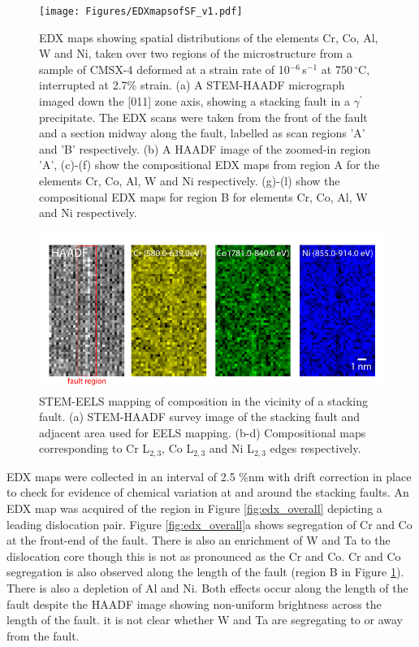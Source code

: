 \documentclass[a4paper,12pt,times,numbered,print,index]{Classes/PhDThesisPSnPDF}
\begin{document}
\begin{figure}
    \centering
    \texttt{[image: Figures/EDXmapsofSF\_v1.pdf]}
    \caption{EDX maps showing spatial distributions of the elements Cr, Co, Al, W and Ni, taken over two regions of the microstructure from a sample of CMSX-4 deformed at a strain rate of 10$^{-6}$\,s$^{-1}$ at 750\,$^\circ$C, interrupted at 2.7\% strain. (a) A STEM-HAADF micrograph imaged down the [011] zone axis, showing a stacking fault in a $\gamma^\prime$ precipitate. The EDX scans were taken from the front of the fault and a section midway along the fault, labelled as scan regions 'A' and 'B' respectively. (b) A HAADF image of the zoomed-in region 'A', (c)-(f) show the compositional EDX maps from region A for the elements Cr, Co, Al, W and Ni respectively. (g)-(l) show the compositional EDX maps for region B for elements Cr, Co, Al, W and Ni respectively.}
    \label{fig:edx_maps}
\end{figure}
\begin{figure}
    \centering
    \includegraphics[width=\textwidth,height=\textheight,keepaspectratio]{Figures/EELSmap_v1.pdf}
    \caption{STEM-EELS mapping of composition in the vicinity of a stacking fault. (a) STEM-HAADF survey image of the stacking fault and adjacent area used for EELS mapping. (b-d) Compositional maps corresponding to Cr L$_{2,3}$, Co L$_{2,3}$ and Ni L$_{2,3}$ edges respectively.}
    \label{fig:EELS_maps}
\end{figure}
EDX maps were collected in an interval of 2.5 \%nm with drift correction in place to check for evidence of chemical variation at and around the stacking faults. An EDX map was acquired of the region in Figure \ref{fig:edx_overall} depicting a leading dislocation pair. Figure \ref{fig:edx_overall}a shows segregation of Cr and Co at the front-end of the fault. There is also an enrichment of W and Ta to the dislocation core though this is not as pronounced as the Cr and Co. Cr and Co segregation is also observed along the length of the fault (region B in Figure \ref{fig:edx_maps}). There is also a depletion of Al and Ni. Both effects occur along the length of the fault despite the HAADF image showing non-uniform brightness across the length of the fault. it is not clear whether W and Ta are segregating to or away from the fault. %
\end{document}
